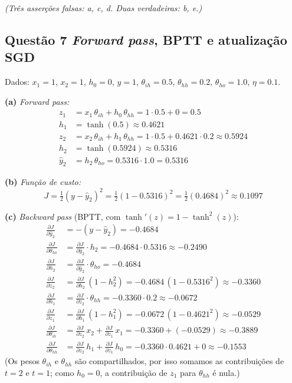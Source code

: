 \documentclass[11pt,a4paper]{article}
\begin{document}
\textit{(Três asserções falsas: a, c, d. Duas verdadeiras: b, e.)}

\subsection*{Questão 7 \textemdash{} \textit{Forward pass}, BPTT e atualização SGD}

Dados: $x_1 = 1$, $x_2 = 1$, $h_0 = 0$, $y = 1$, $\theta_{ih} = 0.5$, $\theta_{hh} = 0.2$, $\theta_{ho} = 1.0$, $\eta = 0.1$.

\textbf{(a)} \textit{Forward pass:}
\begin{align*}
    z_1 &= x_1\,\theta_{ih} + h_0\,\theta_{hh} = 1\cdot 0.5 + 0 = 0.5 \\
    h_1 &= \tanh(0.5) \approx 0.4621 \\
    z_2 &= x_2\,\theta_{ih} + h_1\,\theta_{hh} = 1\cdot 0.5 + 0.4621\cdot 0.2 \approx 0.5924 \\
    h_2 &= \tanh(0.5924) \approx 0.5316 \\
    \hat{y}_2 &= h_2\,\theta_{ho} = 0.5316\cdot 1.0 = 0.5316
\end{align*}

\textbf{(b)} \textit{Função de custo:}
\[
J = \tfrac{1}{2}(y - \hat{y}_2)^2 = \tfrac{1}{2}(1 - 0.5316)^2 = \tfrac{1}{2}(0.4684)^2 \approx 0.1097
\]

\textbf{(c)} \textit{Backward pass} (BPTT, com $\tanh'(z) = 1 - \tanh^2(z)$):
\begin{align*}
    \frac{\partial J}{\partial \hat{y}_2} &= -(y - \hat{y}_2) = -0.4684 \\
    \frac{\partial J}{\partial \theta_{ho}} &= \frac{\partial J}{\partial \hat{y}_2}\cdot h_2 = -0.4684\cdot 0.5316 \approx -0.2490 \\
    \frac{\partial J}{\partial h_2} &= \frac{\partial J}{\partial \hat{y}_2}\cdot \theta_{ho} = -0.4684 \\
    \frac{\partial J}{\partial z_2} &= \frac{\partial J}{\partial h_2}\,(1 - h_2^2) = -0.4684\,(1 - 0.5316^2) \approx -0.3360 \\
    \frac{\partial J}{\partial h_1} &= \frac{\partial J}{\partial z_2}\cdot \theta_{hh} = -0.3360\cdot 0.2 \approx -0.0672 \\
    \frac{\partial J}{\partial z_1} &= \frac{\partial J}{\partial h_1}\,(1 - h_1^2) = -0.0672\,(1 - 0.4621^2) \approx -0.0529 \\[0.3em]
    \frac{\partial J}{\partial \theta_{ih}} &= \frac{\partial J}{\partial z_2}\,x_2 + \frac{\partial J}{\partial z_1}\,x_1 = -0.3360 + (-0.0529) \approx -0.3889 \\
    \frac{\partial J}{\partial \theta_{hh}} &= \frac{\partial J}{\partial z_2}\,h_1 + \frac{\partial J}{\partial z_1}\,h_0 = -0.3360\cdot 0.4621 + 0 \approx -0.1553
\end{align*}
(Os pesos $\theta_{ih}$ e $\theta_{hh}$ são compartilhados, por isso somamos as contribuições de $t = 2$ e $t = 1$; como $h_0 = 0$, a contribuição de $z_1$ para $\theta_{hh}$ é nula.)
\end{document}

